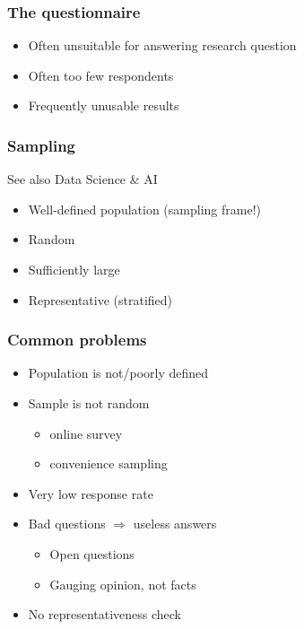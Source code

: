 \documentclass[aspectratio=169]{beamer}
\begin{document}
\begin{frame}
  \frametitle{The questionnaire}

 
 \bigskip
 
 \begin{itemize}
     \item Often unsuitable for answering research question
     \item Often too few respondents
     \item Frequently unusable results
 \end{itemize}

\end{frame}

\begin{frame}
 \frametitle{Sampling}
 
 See also Data Science \& AI
 
 \begin{itemize}
     \item Well-defined population (sampling frame!)
     \item Random
     \item Sufficiently large
     \item Representative (stratified)
 \end{itemize}

\end{frame}

\begin{frame}
  \frametitle{Common problems}

 \begin{itemize}
     \item Population is not/poorly defined
     \item Sample is not random
     \begin{itemize}
         \item online survey
         \item convenience sampling
     \end{itemize}
     \item Very low response rate
     \item Bad questions $\Rightarrow$ useless answers
     \begin{itemize}
         \item Open questions
         \item Gauging opinion, not facts
     \end{itemize}
     \item No representativeness check
 \end{itemize}

\end{frame}
\end{document}
